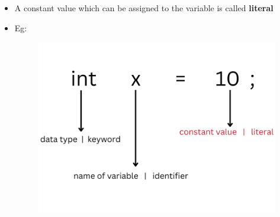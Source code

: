 
\begin{flushleft}


	\begin{itemize}
		\item A constant value which can be assigned to the variable is called \textbf{literal}
		\item Eg:
		\begin{figure}[h!]
			\centering
			\includegraphics[scale=.45]{content/chapter2/images/literal.png}
		\end{figure}		
		
	\end{itemize}


	
\end{flushleft}

\newpage

